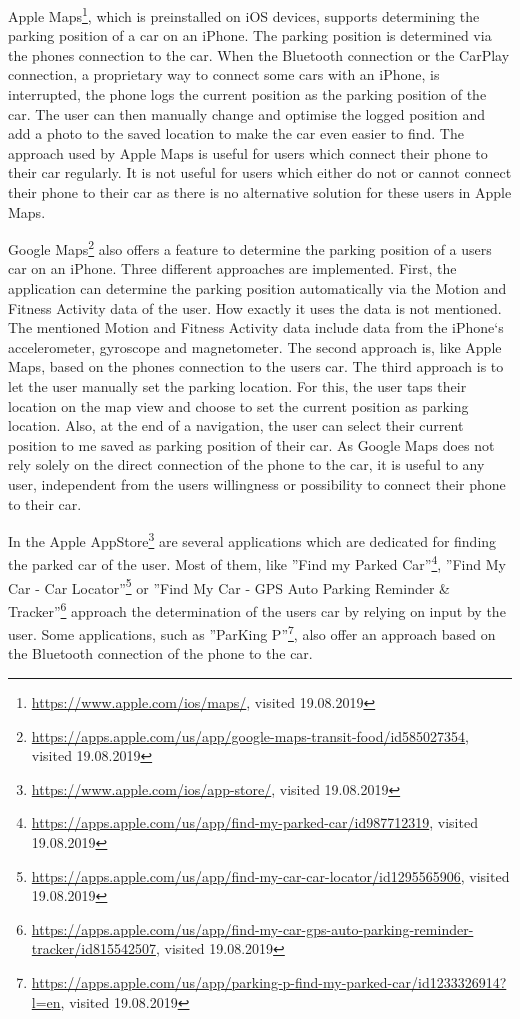 Apple Maps\footnote{\url{https://www.apple.com/ios/maps/}, visited 19.08.2019}, which is preinstalled on iOS devices, supports determining the parking position of a car on an iPhone.  The parking position is determined via the phones connection to the car. When the Bluetooth connection or the CarPlay connection, a proprietary way to connect some cars with an iPhone, is interrupted, the phone logs the current position as the parking position of the car. The user can then manually change and optimise the logged position and add a photo to the saved location to make the car even easier to find. The approach used by Apple Maps is useful for users which connect their phone to their car regularly. It is not useful for users which either do not or cannot connect their phone to their car as there is no alternative solution for these users in Apple Maps. \cite{apple:maps:parkedcar}

Google Maps\footnote{\url{https://apps.apple.com/us/app/google-maps-transit-food/id585027354}, visited 19.08.2019} also offers a feature to determine the parking position of a users car on an iPhone. Three different approaches are implemented. First,  the application can determine the parking position automatically via the Motion and Fitness Activity data of the user. How exactly it uses the data is not mentioned. The mentioned Motion and Fitness Activity data include data from the iPhone`s accelerometer, gyroscope and magnetometer. The second approach is, like Apple Maps, based on the phones connection to the users car. The third approach is to let the user manually set the parking location. For this, the user taps their location on the map view and choose to set the current position as parking location. Also, at the end of a navigation, the user can select their current position to me saved as parking position of their car. As Google Maps does not rely solely on the direct connection of the phone to the car, it is useful to any user, independent from the users willingness or possibility to connect their phone to their car. \cite{google:maps:app:parkedcar}  \cite{apple:CoreMotion}

In the Apple AppStore\footnote{\url{https://www.apple.com/ios/app-store/}, visited 19.08.2019} are several applications which are dedicated for finding the parked car of the user. Most of them, like ''Find my Parked Car''\footnote{\url{https://apps.apple.com/us/app/find-my-parked-car/id987712319}, visited 19.08.2019}, ''Find My Car - Car Locator''\footnote{\url{https://apps.apple.com/us/app/find-my-car-car-locator/id1295565906}, visited 19.08.2019} or ''Find My Car - GPS Auto Parking Reminder \& Tracker''\footnote{\url{https://apps.apple.com/us/app/find-my-car-gps-auto-parking-reminder-tracker/id815542507}, visited 19.08.2019} approach the determination of the users car by relying on input by the user. Some applications, such as ''ParKing P''\footnote{\url{https://apps.apple.com/us/app/parking-p-find-my-parked-car/id1233326914?l=en}, visited 19.08.2019}, also offer an approach based on the Bluetooth connection of the phone to the car. 

